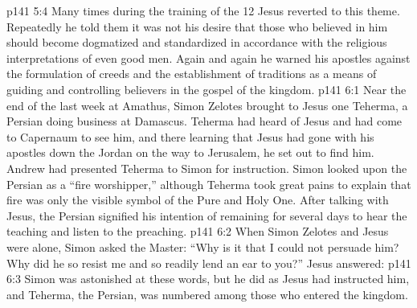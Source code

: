\vs p141 5:4 Many times during the training of the 12 Jesus reverted to this theme. Repeatedly he told them it was not his desire that those who believed in him should become dogmatized and standardized in accordance with the religious interpretations of even good men. Again and again he warned his apostles against the formulation of creeds and the establishment of traditions as a means of guiding and controlling believers in the gospel of the kingdom.
\vs p141 6:1 Near the end of the last week at Amathus, Simon Zelotes brought to Jesus one Teherma, a Persian doing business at Damascus. Teherma had heard of Jesus and had come to Capernaum to see him, and there learning that Jesus had gone with his apostles down the Jordan on the way to Jerusalem, he set out to find him. Andrew had presented Teherma to Simon for instruction. Simon looked upon the Persian as a “fire worshipper,” although Teherma took great pains to explain that fire was only the visible symbol of the Pure and Holy One. After talking with Jesus, the Persian signified his intention of remaining for several days to hear the teaching and listen to the preaching.
\vs p141 6:2 When Simon Zelotes and Jesus were alone, Simon asked the Master: “Why is it that I could not persuade him? Why did he so resist me and so readily lend an ear to you?” Jesus answered: 
\vs p141 6:3 Simon was astonished at these words, but he did as Jesus had instructed him, and Teherma, the Persian, was numbered among those who entered the kingdom.
